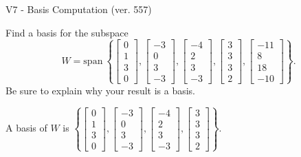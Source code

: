 \begin{exercise}
  \begin{exerciseTitle}V7 - Basis Computation (ver. 557)\end{exerciseTitle}
  \begin{exerciseStatement}
    Find a basis for the subspace 
\[W=\mathrm{span}\ \left\{\left[\begin{array}{r}
0 \\
1 \\
3 \\
0
\end{array}\right] , \left[\begin{array}{r}
-3 \\
0 \\
3 \\
-3
\end{array}\right] , \left[\begin{array}{r}
-4 \\
2 \\
3 \\
-3
\end{array}\right] , \left[\begin{array}{r}
3 \\
3 \\
3 \\
2
\end{array}\right] , \left[\begin{array}{r}
-11 \\
8 \\
18 \\
-10
\end{array}\right]\right\}.\]
 Be sure to explain why your result is a basis.


  \end{exerciseStatement}
  \begin{exerciseAnswer}
   A basis of \(W\) is  \(\left\{\left[\begin{array}{r}
0 \\
1 \\
3 \\
0
\end{array}\right] , \left[\begin{array}{r}
-3 \\
0 \\
3 \\
-3
\end{array}\right] , \left[\begin{array}{r}
-4 \\
2 \\
3 \\
-3
\end{array}\right] , \left[\begin{array}{r}
3 \\
3 \\
3 \\
2
\end{array}\right]\right\}\).
  


  \end{exerciseAnswer}
\end{exercise}